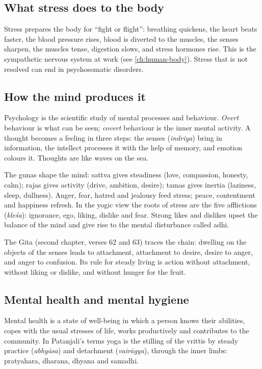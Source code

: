 \subsection*{What stress does to the body}
Stress prepares the body for ``fight or flight'': breathing quickens, the heart beats faster, the blood pressure rises, blood is diverted to the muscles, the senses sharpen, the muscles tense, digestion slows, and stress hormones rise. This is the sympathetic nervous system at work (see \cref{ch:human-body}). Stress that is not resolved can end in psychosomatic disorders.

\subsection*{How the mind produces it}
Psychology is the scientific study of mental processes and behaviour. \emph{Overt} behaviour is what can be seen; \emph{covert} behaviour is the inner mental activity. A thought becomes a feeling in three steps: the senses (\emph{indriya}) bring in information, the intellect processes it with the help of memory, and emotion colours it. Thoughts are like waves on the sea.

The gunas shape the mind: sattva gives steadiness (love, compassion, honesty, calm); rajas gives activity (drive, ambition, desire); tamas gives inertia (laziness, sleep, dullness). Anger, fear, hatred and jealousy feed stress; peace, contentment and happiness refresh. In the yogic view the roots of stress are the five afflictions (\emph{kleśa}): ignorance, ego, liking, dislike and fear. Strong likes and dislikes upset the balance of the mind and give rise to the mental disturbance called adhi.

The Gita (second chapter, verses 62 and 63) traces the chain: dwelling on the objects of the senses leads to attachment, attachment to desire, desire to anger, and anger to confusion. Its rule for steady living is action without attachment, without liking or dislike, and without hunger for the fruit.

\subsection*{Mental health and mental hygiene}
Mental health is a state of well-being in which a person knows their abilities, copes with the usual stresses of life, works productively and contributes to the community. In Patanjali's terms yoga is the stilling of the vrittis by steady practice (\emph{abhyāsa}) and detachment (\emph{vairāgya}), through the inner limbs: pratyahara, dharana, dhyana and samadhi.

